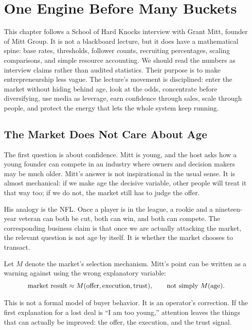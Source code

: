 \chapter{One Engine Before Many Buckets}

This chapter follows a School of Hard Knocks interview with Grant Mitt, founder of Mitt Group. It is not a blackboard lecture, but it does have a mathematical spine: base rates, thresholds, follower counts, recruiting percentages, scaling comparisons, and simple resource accounting. We should read the numbers as interview claims rather than audited statistics. Their purpose is to make entrepreneurship less vague. The lecture's movement is disciplined: enter the market without hiding behind age, look at the odds, concentrate before diversifying, use media as leverage, earn confidence through sales, scale through people, and protect the energy that lets the whole system keep running.

\section{The Market Does Not Care About Age}

The first question is about confidence. Mitt is young, and the host asks how a young founder can compete in an industry where owners and decision makers may be much older. Mitt's answer is not inspirational in the usual sense. It is almost mechanical: if we make age the decisive variable, other people will treat it that way too; if we do not, the market still has to judge the offer.

His analogy is the NFL. Once a player is in the league, a rookie and a nineteen-year veteran can both be cut, both can win, and both can compete. The corresponding business claim is that once we are actually attacking the market, the relevant question is not age by itself. It is whether the market chooses to transact.

Let \(M\) denote the market's selection mechanism. Mitt's point can be written as a warning against using the wrong explanatory variable:
\begin{equation}
  \hbox{market result}
  \approx
  M(\hbox{offer},\hbox{execution},\hbox{trust}),
  \qquad
  \hbox{not simply } M(\hbox{age}).
\end{equation}

This is not a formal model of buyer behavior. It is an operator's correction. If the first explanation for a lost deal is ``I am too young,'' attention leaves the things that can actually be improved: the offer, the execution, and the trust signal.

